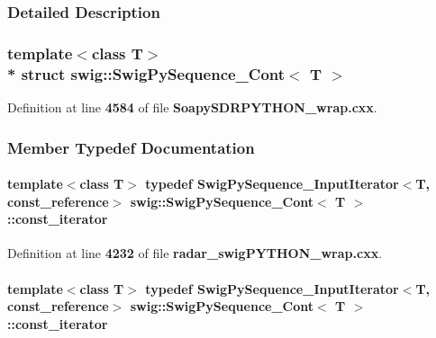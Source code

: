 \subsubsection{Detailed Description}
\subsubsection*{template$<$class T$>$\\*
struct swig\+::\+Swig\+Py\+Sequence\+\_\+\+Cont$<$ T $>$}



Definition at line {\bf 4584} of file {\bf Soapy\+S\+D\+R\+P\+Y\+T\+H\+O\+N\+\_\+wrap.\+cxx}.



\subsubsection{Member Typedef Documentation}
\paragraph[{const\+\_\+iterator}]{\setlength{\rightskip}{0pt plus 5cm}template$<$class T$>$ typedef {\bf Swig\+Py\+Sequence\+\_\+\+Input\+Iterator}$<$T, {\bf const\+\_\+reference}$>$ {\bf swig\+::\+Swig\+Py\+Sequence\+\_\+\+Cont}$<$ T $>$\+::{\bf const\+\_\+iterator}}\label{structswig_1_1SwigPySequence__Cont_a708a6b3790b68aa53bd79d27a2c16b89}


Definition at line {\bf 4232} of file {\bf radar\+\_\+swig\+P\+Y\+T\+H\+O\+N\+\_\+wrap.\+cxx}.

\paragraph[{const\+\_\+iterator}]{\setlength{\rightskip}{0pt plus 5cm}template$<$class T$>$ typedef {\bf Swig\+Py\+Sequence\+\_\+\+Input\+Iterator}$<$T, {\bf const\+\_\+reference}$>$ {\bf swig\+::\+Swig\+Py\+Sequence\+\_\+\+Cont}$<$ T $>$\+::{\bf const\+\_\+iterator}}\label{structswig_1_1SwigPySequence__Cont_a708a6b3790b68aa53bd79d27a2c16b89}


